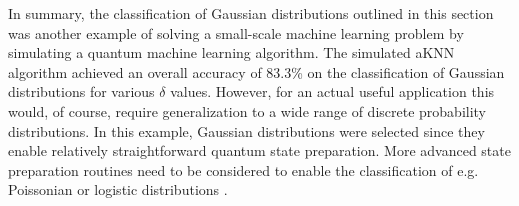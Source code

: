 In summary, the classification of Gaussian distributions outlined in this section was another example of solving a small-scale machine learning problem by simulating a quantum machine learning algorithm. The simulated aKNN algorithm achieved an overall accuracy of 83.3\% on the classification of Gaussian distributions for various $\delta$ values. However, for an actual useful application this would, of course, require generalization to a wide range of discrete probability distributions. In this example, Gaussian distributions were selected since they enable relatively straightforward quantum state preparation. More advanced state preparation routines need to be considered to enable the classification of e.g. Poissonian or logistic distributions \cite{Grover2002,soklakov2006efficient}.







